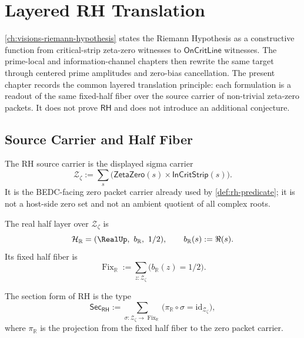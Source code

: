 \chapter{Layered RH Translation}
\label{ch:visions-rh-layered-translation}

\autoref{ch:visions-riemann-hypothesis} states the Riemann Hypothesis as a
constructive function from critical-strip zeta-zero witnesses to
$\mathsf{OnCritLine}$ witnesses. The prime-local and information-channel
chapters then rewrite the same target through centered prime amplitudes and
zero-bias cancellation. The present chapter records the common layered
translation principle: each formulation is a readout of the same fixed-half
fiber over the source carrier of non-trivial zeta-zero packets. It does not
prove $\mathsf{RH}$ and does not introduce an additional conjecture.

\section{Source Carrier and Half Fiber}
\label{sec:rh-layered-source-half-fiber}

\begin{definition}
\label{def:rh-layered-source-carrier}
The RH source carrier is the displayed sigma carrier
$$
\mathcal Z_{\zeta}
:=
\sum_s
\bigl(
\mathsf{ZetaZero}(s)\times\mathsf{InCritStrip}(s)
\bigr).
$$
It is the BEDC-facing zero packet carrier already used by
\autoref{def:rh-predicate}; it is not a host-side zero set and not an
ambient quotient of all complex roots.
\end{definition}

\begin{definition}
\label{def:rh-layered-real-half-layer}
The real half layer over $\mathcal Z_{\zeta}$ is
$$
\mathcal H_{\mathbb R}
=
(\RealUp,\ b_{\mathbb R},\ 1/2),
\qquad
b_{\mathbb R}(s):=\Re(s).
$$
Its fixed half fiber is
$$
\operatorname{Fix}_{\mathbb R}
:=
\sum_{z:\mathcal Z_{\zeta}}
\bigl(b_{\mathbb R}(z)=1/2\bigr).
$$
\end{definition}

\begin{definition}
\label{def:rh-layered-section-form}
The section form of RH is the type
$$
\mathsf{Sec}_{\mathsf{RH}}
:=
\sum_{\sigma:\mathcal Z_{\zeta}\to\operatorname{Fix}_{\mathbb R}}
\bigl(\pi_{\mathbb R}\circ\sigma=\mathrm{id}_{\mathcal Z_{\zeta}}\bigr),
$$
where $\pi_{\mathbb R}$ is the projection from the fixed half fiber to
the zero packet carrier.
\end{definition}

